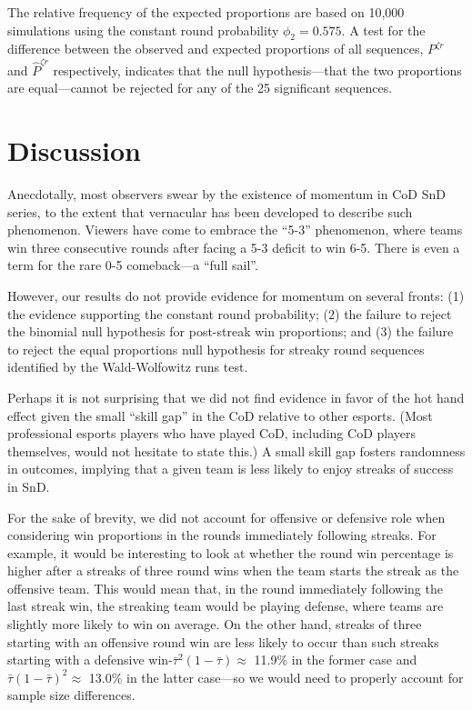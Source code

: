 \documentclass{article}
\begin{document}
The relative frequency of the expected proportions are based on 10,000
simulations using the constant round probability \(\phi_2 = 0.575\). A
test for the difference between the observed and expected proportions of
all sequences, \(P^{\zeta r}\) and \(\hat{P}^{\zeta r}\) respectively,
indicates that the null hypothesis---that the two proportions are
equal---cannot be rejected for any of the 25 significant sequences.

\hypertarget{discussion}{%
\section{Discussion}\label{discussion}}

Anecdotally, most observers swear by the existence of momentum in CoD
SnD series, to the extent that vernacular has been developed to describe
such phenomenon. Viewers have come to embrace the ``5-3'' phenomenon,
where teams win three consecutive rounds after facing a 5-3 deficit to
win 6-5. There is even a term for the rare 0-5 comeback---a ``full
sail''.

However, our results do not provide evidence for momentum on several
fronts: (1) the evidence supporting the constant round probability; (2)
the failure to reject the binomial null hypothesis for post-streak win
proportions; and (3) the failure to reject the equal proportions null
hypothesis for streaky round sequences identified by the Wald-Wolfowitz
runs test.

Perhaps it is not surprising that we did not find evidence in favor of
the hot hand effect given the small ``skill gap'' in the CoD relative to
other esports. (Most professional esports players who have played CoD,
including CoD players themselves, would not hesitate to state this.) A
small skill gap fosters randomness in outcomes, implying that a given
team is less likely to enjoy streaks of success in SnD.

For the sake of brevity, we did not account for offensive or defensive
role when considering win proportions in the rounds immediately
following streaks. For example, it would be interesting to look at
whether the round win percentage is higher after a streaks of three
round wins when the team starts the streak as the offensive team. This
would mean that, in the round immediately following the last streak win,
the streaking team would be playing defense, where teams are slightly
more likely to win on average. On the other hand, streaks of three
starting with an offensive round win are less likely to occur than such
streaks starting with a defensive
win-\(\bar{\tau}^2 (1 - \bar{\tau}) \approx\) 11.9\% in the former case
and \(\bar{\tau} (1 - \bar{\tau})^2 \approx\) 13.0\% in the latter
case---so we would need to properly account for sample size differences.
\end{document}
